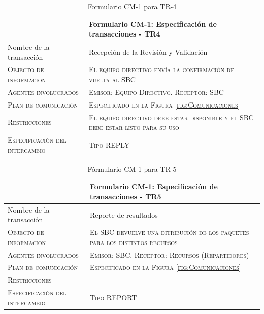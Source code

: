 \begin{table}[H]
  \scriptsize
  \begin{tabularx}{\textwidth}{|l|X|} \hline
    & \textbf{Formulario CM-1: Especificación de transacciones - TR4} \\
    \hline\hline
    {Nombre de la transacción} & Recepción de la Revisión y Validación\\
    \hline  
    \textsc{Objecto de informacion} & \textsc{El equipo directivo envía la confirmación de vuelta al SBC}\\ 
    \hline
    \textsc{Agentes involucrados} & \textsc{Emisor: Equipo Directivo. Receptor: SBC}\\ 
    \hline
    \textsc{Plan de comunicación} & \textsc{Especificado en la Figura \ref{fig:Comunicaciones}}\\ 
    \hline
    \textsc{Restricciones} & \textsc{El equipo directivo debe estar disponible y el SBC debe estar listo para su uso}\\ 
    \hline
    \textsc{Especificación del intercambio} & \textsc{Tipo REPLY}\\ 
    \hline
  \end{tabularx}
    \caption{\label{tab:TR4}Formulario CM-1 para TR-4}
\end{table}

\begin{table}[H]
  \scriptsize
  \begin{tabularx}{\textwidth}{|l|X|} \hline
    & \textbf{Formulario CM-1: Especificación de transacciones - TR5} \\
    \hline\hline
    {Nombre de la transacción} & Reporte de resultados\\
    \hline  
    \textsc{Objecto de informacion} & \textsc{El SBC devuelve una ditribución de los paquetes para los distintos recursos}\\ 
    \hline
    \textsc{Agentes involucrados} & \textsc{Emisor: SBC, Receptor: Recursos (Repartidores)}\\ 
    \hline
    \textsc{Plan de comunicación} & \textsc{Especificado en la Figura \ref{fig:Comunicaciones}}\\ 
    \hline
    \textsc{Restricciones} & \textsc{-}\\ 
    \hline
    \textsc{Especificación del intercambio} & \textsc{Tipo REPORT}\\ 
    \hline
  \end{tabularx}
    \caption{\label{tab:TR5}Fórmulario CM-1 para TR-5}
\end{table}